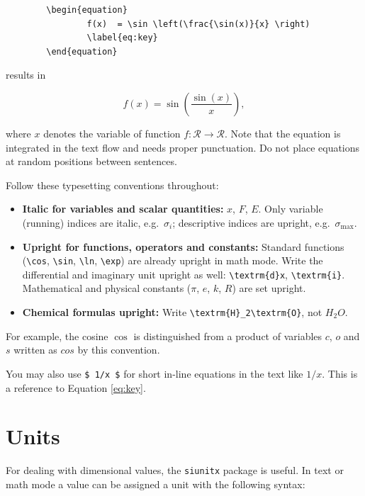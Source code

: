 {    \begin{Verbatim}
    	\begin{equation}
                f(x)  = \sin \left(\frac{\sin(x)}{x} \right)
    	        \label{eq:key}
    	\end{equation}
    \end{Verbatim}
    
    results in 
    
    \begin{equation}
         f(x)  = \sin \left(\frac{\sin(x)}{x} \right),
    \label{eq:key}
    \end{equation}

    where $x$ denotes the variable of function $f: \mathcal{R} \rightarrow \mathcal{R}$. Note that the equation is integrated in the text flow and needs proper punctuation. Do not place equations at random positions between sentences.
    
    Follow these typesetting conventions throughout:
    \begin{itemize}
        \item \textbf{Italic for variables and scalar quantities:} $x$, $F$, $E$. Only variable (running) indices are italic, e.g.\ $\sigma_i$; descriptive indices are upright, e.g.\ $\sigma_\textrm{max}$.
        \item \textbf{Upright for functions, operators and constants:} Standard functions (\verb|\cos|, \verb|\sin|, \verb|\ln|, \verb|\exp|) are already upright in math mode. Write the differential and imaginary unit upright as well: \verb|\textrm{d}x|, \verb|\textrm{i}|. Mathematical and physical constants ($\pi$, $e$, $k$, $R$) are set upright.
        \item \textbf{Chemical formulas upright:} Write \verb|\textrm{H}_2\textrm{O}|, not $H_2O$.
    \end{itemize}
    For example, the cosine $\cos$ is distinguished from a product of variables $c$, $o$ and $s$ written as $cos$ by this convention.

    You may also use \verb|$ 1/x $| for short in-line equations in the text like $1/x$. This is a reference to Equation \ref{eq:key}.

    \section*{Units}
    For dealing with dimensional values, the \texttt{siunitx} package is useful. In text or math mode a value can be assigned a unit with the following syntax:
    
}
